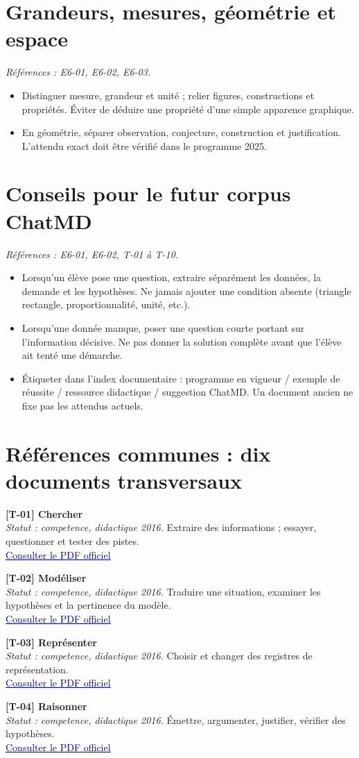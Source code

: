 \documentclass[11pt,a4paper]{article}
\newcommand{\refsource}[1]{\textsf{\textcolor{slate}{[#1]}}}
\newcommand{\sectionref}[2]{\section{#1}\textit{Références : #2.}\par}
\newcommand{\entreesource}[5]{\par\noindent\textbf{\refsource{#1} #2}\\[-2pt]\textit{Statut : #3.} #4\\[-2pt]\href{#5}{\textcolor{navy}{\underline{Consulter le PDF officiel}}}\par\smallskip}
\begin{document}
\sectionref{Grandeurs, mesures, géométrie et espace}{E6-01, E6-02, E6-03}
\begin{itemize}
\item Distinguer mesure, grandeur et unité ; relier figures, constructions et propriétés. Éviter de déduire une propriété d’une simple apparence graphique.
\item En géométrie, séparer observation, conjecture, construction et justification. L’attendu exact doit être vérifié dans le programme 2025.
\end{itemize}
\sectionref{Conseils pour le futur corpus ChatMD}{E6-01, E6-02, T-01 à T-10}
\begin{itemize}
\item Lorsqu’un élève pose une question, extraire séparément les données, la demande et les hypothèses. Ne jamais ajouter une condition absente (triangle rectangle, proportionnalité, unité, etc.).
\item Lorsqu’une donnée manque, poser une question courte portant sur l’information décisive. Ne pas donner la solution complète avant que l’élève ait tenté une démarche.
\item Étiqueter dans l’index documentaire : programme en vigueur / exemple de réussite / ressource didactique / suggestion ChatMD. Un document ancien ne fixe pas les attendus actuels.
\end{itemize}
\section{Références communes : dix documents transversaux}
\entreesource{T-01}{Chercher}{competence, didactique 2016}{Extraire des informations ; essayer, questionner et tester des pistes.}{https://eduscol.education.gouv.fr/sites/default/files/document/ra16c4mathchercher552125pdf-77583.pdf}

\entreesource{T-02}{Modéliser}{competence, didactique 2016}{Traduire une situation, examiner les hypothèses et la pertinence du modèle.}{https://eduscol.education.gouv.fr/sites/default/files/document/ra16c4mathmodelisernd566177pdf-77586.pdf}

\entreesource{T-03}{Représenter}{competence, didactique 2016}{Choisir et changer des registres de représentation.}{https://eduscol.education.gouv.fr/sites/default/files/document/ra16c4mathrepresenternd566207pdf-77589.pdf}

\entreesource{T-04}{Raisonner}{competence, didactique 2016}{Émettre, argumenter, justifier, vérifier des hypothèses.}{https://eduscol.education.gouv.fr/sites/default/files/document/ra16c4mathraisonner547836pdf-77592.pdf}
\end{document}
